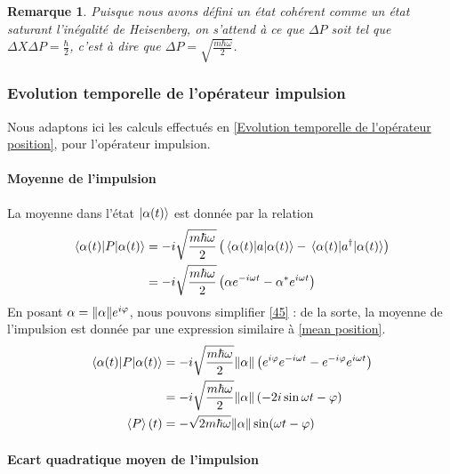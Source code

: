 \documentclass[11pt,oneside,a4paper]{article}
\newcommand{\h}{\ensuremath{\hbar}}
\newtheorem{remark}[theorem]{Remarque}
\begin{document}
\begin{remark}
  Puisque nous avons défini un état cohérent comme un état saturant l'inégalité de Heisenberg, on s'attend à ce que $\Delta P$ soit tel que $\Delta X\Delta P = \frac{\h}{2}$, c'est à dire que $\Delta P = \sqrt{\frac{m\h\omega}{2}}$.
\end{remark}

\subsubsection{Evolution temporelle de l'opérateur impulsion}
\label{Evolution temporelle de l'opérateur impulsion}

Nous adaptons ici les calculs effectués en \ref{Evolution temporelle de l'opérateur position}, pour l'opérateur impulsion.

\paragraph{Moyenne de l'impulsion}

La moyenne dans l'état $\ket{\alpha(t)}$ est donnée par la relation
\begin{align}
  \expval{P}{\alpha(t)} &= -i\sqrt{\frac{m\h\omega}{2}}\left(\expval{a}{\alpha(t)}-\expval{a^\dagger}{\alpha(t)}\right)\\
  &= -i\sqrt{\frac{m\h\omega}{2}}\left(\alpha e^{-i\omega t}-\alpha^*e^{i\omega t}\right)\label{45}
\end{align}
En posant $\alpha = \norm{\alpha}e^{i\varphi}$, nous pouvons simplifier \eqref{45} : de la sorte, la moyenne de l'impulsion est donnée par une expression similaire à \eqref{mean position}.
\begin{align}
  \expval{P}{\alpha(t)} &= -i\sqrt{\frac{m\h\omega}{2}}\norm{\alpha}\left(e^{i\varphi}e^{-i\omega t}-e^{-i\varphi}e^{i\omega t}\right)\\
  &= -i\sqrt{\frac{m\h\omega}{2}}\norm{\alpha} \left(-2i\sin\omega t-\varphi\right)\\
  \expval{P}(t) &= -\sqrt{2m\h\omega}\norm{\alpha}\sin(\omega t-\varphi) \label{mean P}
\end{align} 

\paragraph{Ecart quadratique moyen de l'impulsion}
\end{document}
